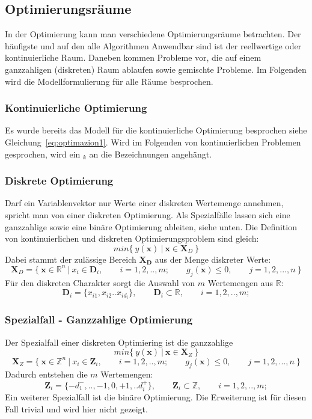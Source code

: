 \subsection{Optimierungsräume}
%
In der Optimierung kann man verschiedene Optimierungsräume betrachten. Der häufigste und auf den alle Algorithmen Anwendbar sind ist der reellwertige oder kontinuierliche Raum. Daneben kommen Probleme vor, die auf einem ganzzahligen (diskreten) Raum ablaufen sowie gemischte Probleme. Im Folgenden wird die Modellformulierung für alle Räume besprochen.
%
\subsubsection{Kontinuierliche Optimierung}
%
Es wurde bereits das Modell für die kontinuierliche Optimierung besprochen siehe Gleichung~\ref{eq:optimazion1}. Wird im Folgenden von kontinuierlichen Problemen gesprochen, wird ein $_k$ an die Bezeichnungen angehängt.
%
\subsubsection{Diskrete Optimierung}
%
Darf ein Variablenvektor nur Werte einer diskreten Wertemenge annehmen, spricht man von einer diskreten Optimierung. Als Spezialfälle lassen sich eine ganzzahlige sowie eine binäre Optimierung ableiten, siehe unten. Die Definition von kontinuierlichen und diskreten Optimierungsproblem sind gleich:
%
\begin{equation}
	min\{~y(\mathbf{x})~|~\mathbf{x}\in\mathbf{X}_D~\}
\end{equation}
%
Dabei stammt der zulässige Bereich $\mathbf{X_D}$ aus der Menge diskreter Werte:
$$
\mathbf{X}_D=\{~\mathbf{x}\in \mathbb{R}^n~|~x_i\in \mathbf{D}_i,\qquad i=1,2,..,m;\qquad g_j(\mathbf{x})\leq 0, \qquad j=1,2,...,n~\}
$$
Für den diskreten Charakter sorgt die Auswahl von $m$ Wertemengen aus $\mathbb{R}$:
$$
\mathbf{D}_i=\{x_{i1},x_{i2}..x_{id_i}\},\qquad \mathbf{D}_i \subset \mathbb{R},\qquad i=1,2,..,m;
$$
\subsubsection{Spezialfall - Ganzzahlige Optimierung}
%
Der Spezialfall einer diskreten Optimiering ist die ganzzahlige
\begin{equation}
	min\{~y(\mathbf{x})~|~\mathbf{x}\in\mathbf{X}_Z~\}
\end{equation}
%
$$
\mathbf{X}_Z=\{~\mathbf{x}\in \mathbb{Z}^n~|~x_i\in \mathbf{Z}_i,\qquad i=1,2,..,m;\qquad g_j(\mathbf{x})\leq 0, \qquad j=1,2,...,n~\}
$$
Dadurch entstehen die $m$ Wertemengen:
$$
\mathbf{Z}_i=\{-d_1^-,..,-1,0,+1,..d_{i}^+\},\qquad \mathbf{Z}_i \subset \mathbb{Z},\qquad i=1,2,..,m;
$$
Ein weiterer Spezialfall ist die binäre Optimierung. Die Erweiterung ist für diesen Fall trivial und wird hier nicht gezeigt.
%
